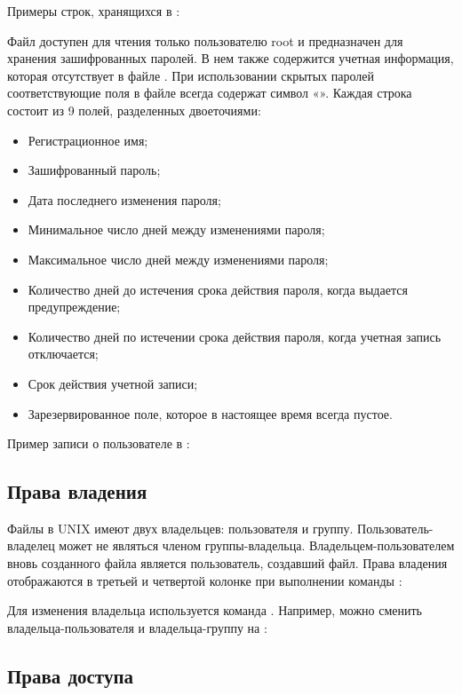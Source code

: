 Примеры строк, хранящихся в :


Файл  доступен для чтения только пользователю root и предназначен для хранения зашифрованных паролей. В нем также содержится учетная информация, которая отсутствует в файле . При использовании скрытых паролей соответствующие поля в файле  всегда содержат символ «». Каждая строка состоит из 9 полей, разделенных двоеточиями:
\begin{itemize}
	\item Регистрационное имя;
	\item Зашифрованный пароль;
	\item Дата последнего изменения пароля;
	\item Минимальное число дней между изменениями пароля;
	\item Максимальное число дней между изменениями пароля;
	\item Количество дней до истечения срока действия пароля, когда выдается предупреждение;
	\item Количество дней по истечении срока действия пароля, когда учетная запись отключается;
	\item Срок действия учетной записи;
	\item Зарезервированное поле, которое в настоящее время всегда пустое.
\end{itemize}

Пример записи о пользователе в :


\subsection{Права владения}

Файлы в UNIX имеют двух владельцев: пользователя и группу. Пользователь-владелец может не являться членом группы-владельца. Владельцем-пользователем вновь созданного файла является пользователь, создавший файл. Права владения отображаются в третьей и четвертой колонке при выполнении команды :


Для изменения владельца используется команда . Например, можно сменить владельца-пользователя и владельца-группу на :


\subsection{Права доступа}

